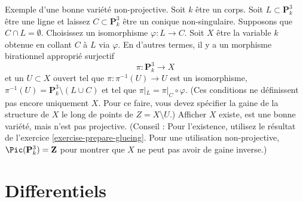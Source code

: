 \begin{exercise}
\label{exercise-nonprojective}
Exemple d'une bonne variété non-projective. Soit $k$
être un corps. Soit $L \subset \mathbf{P}^3_k$ être une ligne et laissez
$C \subset \mathbf{P}^3_k$ être un conique non-singulaire. Supposons que $C \cap L
= \emptyset$. Choisissez un isomorphisme
$\varphi : L \to C$. Soit $X$ être la variable $k$ obtenue
en collant $C$ à $L$ via $\varphi$. En d'autres termes, il
y a un morphisme birationnel approprié surjectif
$$
\pi : \mathbf{P}^3_k \longrightarrow X
$$
et un $U \subset X$ ouvert tel que $\pi : \pi^{-1}(U)
\to U$ est un isomorphisme, $\pi^{-1}(U) = \mathbf{P}^3_k \setminus (L \cup
C)$ et tel que $\pi|_L = \pi|_C \circ \varphi$. (Ces conditions ne définissent
pas encore uniquement $X$. Pour ce faire, vous devez spécifier la
gaine de la structure de $X$ le long de points de
$Z = X \setminus U$.) Afficher $X$ existe, est une
bonne variété, mais n'est pas projective.
(Conseil : Pour l'existence, utilisez le résultat de l'exercice \ref{exercise-prepare-glueing}. Pour une
utilisation non-projective, $\Pic(\mathbf{P}^3_k) = \mathbf{Z}$ pour montrer que $X$ ne peut
pas avoir de gaine inverse.)
\end{exercise}



\section{Differentiels}
\label{section-differentials}

